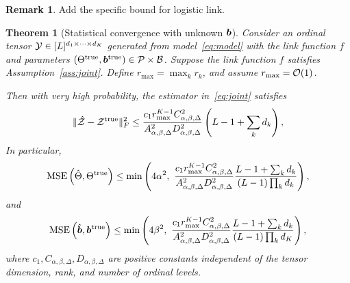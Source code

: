 \documentclass[11pt]{article}
\theoremstyle{plain}
\newtheorem{thm}{Theorem}[section]
\theoremstyle{definition}
\newtheorem{rmk}{Remark}
\begin{document}
\begin{rmk} Add the specific bound for logistic link. 
\end{rmk}
\begin{thm}[Statistical convergence with unknown $\bm{b}$]\label{thm:ratejoint}
Consider an ordinal tensor $\mathcal{Y}\in[L]^{d_1\times \cdots \times d_K}$ generated from model~\eqref{eq:model} with the link function $f$ and parameters $(\Theta^{\mathrm{true}}, \bm{b}^{\mathrm{true}})\in\mathcal{P}\times \mathcal{B}$. Suppose the link function $f$ satisfies Assumption~\ref{ass:joint}. Define $r_{\max}=\max_k r_k$, and assume $r_{\max}=\mathcal{O}(1)$. 

Then with very high probability, the estimator in~\eqref{eq:joint} satisfies
\begin{equation}\label{eq:scoreZ}
\lVert\hat {\mathcal{Z}}-\mathcal{Z}^{\mathrm{true}}\rVert_F^2 \leq {c_1r^{K-1}_{\max}C^2_{\alpha,\beta,\Delta}\over A^2_{\alpha,\beta,\Delta}D^2_{\alpha,\beta,\Delta}}\left(L-1+\sum_k d_k\right),
\end{equation}
In particular,
\begin{equation}\label{eq:jointTheta}
\mathrm{MSE}\left(\hat \Theta, \Theta^{\mathrm{true}} \right)\leq\min\left( 4\alpha^2,\  {c_1 r_{\max}^{K-1}  C_{\alpha,\beta,\Delta}^2  \over A^2_{\alpha,\beta,\Delta}D_{\alpha,\beta,\Delta}^2}{ L-1+\sum_k d_k \over (L-1)\prod_k d_k}\right),
\end{equation}
and
\begin{equation}\label{eq:jointb}
\mathrm{MSE}\left(\hat {\bm{b}}, \bm{b}^{\mathrm{true}} \right)\leq \min\left(4\beta^2,\ {c_1 r^{K-1}_{\max} C^2_{\alpha,\beta,\Delta} \over A^2_{\alpha,\beta,\Delta}D_{\alpha,\beta,\Delta}^2}{L-1+\sum_kd_k \over (L-1)\prod_k d_K}\right),
\end{equation}
where $c_1, C_{\alpha,\beta,\Delta}, D_{\alpha,\beta,\Delta}$ are positive constants independent of the tensor dimension, rank, and number of ordinal levels. 
\end{thm}
\end{document}
